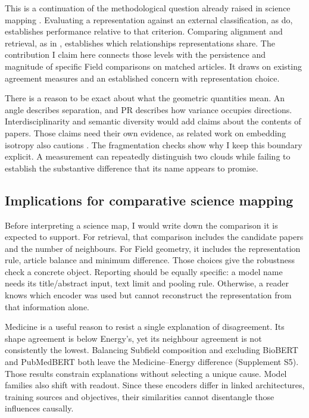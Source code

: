 \documentclass[12pt]{article}
\begin{document}
This is a continuation of the methodological question already raised in science mapping \citep{refa0d2d707e6,ref6a2f5912bc}. Evaluating a representation against an external classification, as \citet{refc0e2cc29e0} do, establishes performance relative to that criterion. Comparing alignment and retrieval, as in \citet{ref4e1e0d5582}, establishes which relationships representations share. The contribution I claim here connects those levels with the persistence and magnitude of specific Field comparisons on matched articles. It draws on existing agreement measures and an established concern with representation choice.

There is a reason to be exact about what the geometric quantities mean. An angle describes separation, and PR describes how variance occupies directions. Interdisciplinarity and semantic diversity would add claims about the contents of papers. Those claims need their own evidence, as related work on embedding isotropy also cautions \citep{rudman-etal-2022-isoscore}. The fragmentation checks show why I keep this boundary explicit. A measurement can repeatedly distinguish two clouds while failing to establish the substantive difference that its name appears to promise.

\subsection{Implications for comparative science mapping}
Before interpreting a science map, I would write down the comparison it is expected to support. For retrieval, that comparison includes the candidate papers and the number of neighbours. For Field geometry, it includes the representation rule, article balance and minimum difference. Those choices give the robustness check a concrete object. Reporting should be equally specific: a model name needs its title/abstract input, text limit and pooling rule. Otherwise, a reader knows which encoder was used but cannot reconstruct the representation from that information alone.

Medicine is a useful reason to resist a single explanation of disagreement. Its shape agreement is below Energy's, yet its neighbour agreement is not consistently the lowest. Balancing Subfield composition and excluding BioBERT and PubMedBERT both leave the Medicine--Energy difference (Supplement S5). Those results constrain explanations without selecting a unique cause. Model families also shift with readout. Since these encoders differ in linked architectures, training sources and objectives, their similarities cannot disentangle those influences causally.
\end{document}

